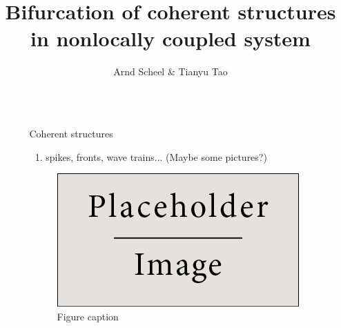 \documentclass[final]{beamer}
\title{Bifurcation of coherent structures in nonlocally coupled system} %
\author{Arnd Scheel \& Tianyu Tao} %
\institute{University of Minnesota} %
\newlength{\sepwid}
\newlength{\onecolwid}
\begin{document}

\setlength{\belowcaptionskip}{2ex} %
\setlength\belowdisplayshortskip{2ex} %

\begin{frame}[t] %

\begin{columns}[t] %

\begin{column}{\sepwid}\end{column} %

\begin{column}{\onecolwid} %



\begin{block}{Coherent structures}
\begin{enumerate}
\item spikes, fronts, wave trains... (Maybe some pictures?)
\end{enumerate}
\end{block}

\begin{figure}
\includegraphics[width=0.8\linewidth]{placeholder.jpg}
\caption{Figure caption}
\end{figure}


\end{column}
\end{columns}
\end{frame}
\end{document}

